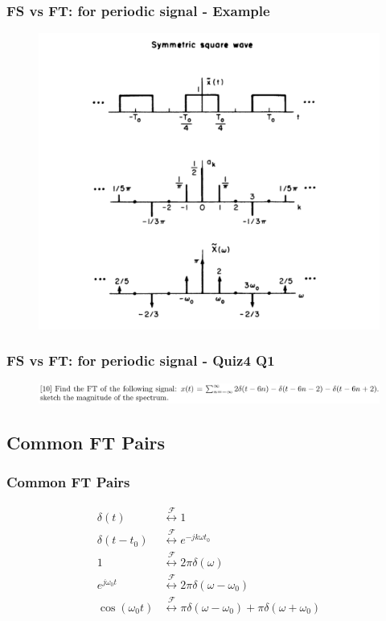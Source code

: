 \documentclass{beamer}
\begin{document}
\begin{frame}
    \frametitle{FS vs FT: for periodic signal - Example}
    \begin{figure}
        \includegraphics[width=0.7\linewidth]{FSvsFT_eg}
    \end{figure}
\end{frame}

\begin{frame}[t]
    \frametitle{FS vs FT: for periodic signal - Quiz4 Q1}
    \begin{figure}
        \includegraphics[width=1\linewidth]{quiz4q1.png}
    \end{figure}

\end{frame}

\subsection{Common FT Pairs}
\begin{frame}
    \frametitle{Common FT Pairs}
\begin{center}
    \begin{align*}
        \delta(t) &\stackrel{\mathscr{F}}{\longleftrightarrow}  1 \\[1em]
        \delta(t-t_0) &\stackrel{\mathscr{F}}{\longleftrightarrow}  e^{-jk\omega t_0} \\[1em]
        1 &\stackrel{\mathscr{F}}{\longleftrightarrow}  2\pi \delta(\omega) \\[1em]
        e^{j\omega_0 t} &\stackrel{\mathscr{F}}{\longleftrightarrow} 2 \pi \delta(\omega - \omega_0) \\[1em]
        \cos(\omega_0 t) &\stackrel{\mathscr{F}}{\longleftrightarrow} \pi \delta(\omega - \omega_0) + \pi \delta(\omega + \omega_0)
    \end{align*}
\end{center} 

\end{frame}
\end{document}
